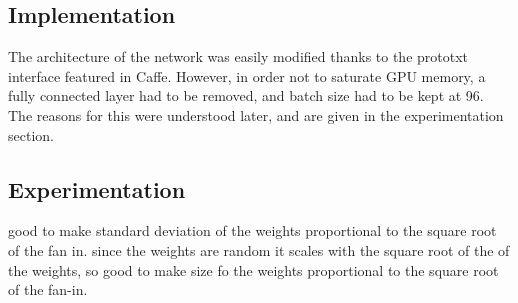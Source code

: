 \documentclass[a4paper,11pt]{article}
\begin{document}
\subsection{Implementation}

The architecture of the network was easily modified thanks to the prototxt interface featured in Caffe. However, in order not to saturate GPU memory, a fully connected layer had to be removed, and batch size had to be kept at 96. The reasons for this were understood later, and are given in the experimentation section. \\

\subsection{Experimentation}

good to make standard deviation of the weights proportional to the square root of the fan in. 
since the weights are random it scales with the square root of the of the weights, so good to make size fo the weights proportional to the square root of the fan-in. 
\end{document}
